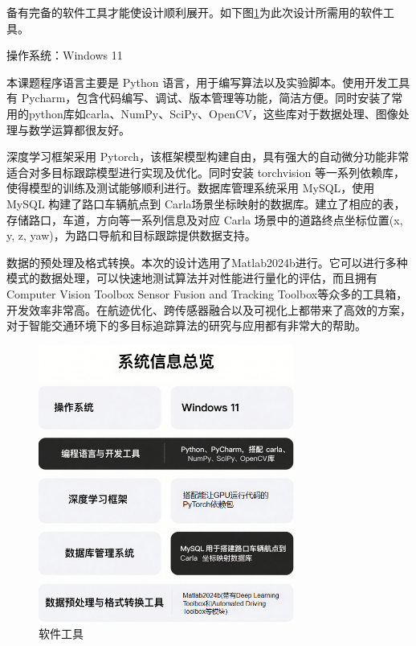 备有完备的软件工具才能使设计顺利展开。如下图\ref{fig:p31}为此次设计所需用的软件工具。

操作系统：Windows 11

本课题程序语言主要是 Python 语言，用于编写算法以及实验脚本。使用开发工具有 Pycharm，包含代码编写、调试、版本管理等功能，简洁方便。同时安装了常用的python库如carla、NumPy、SciPy、OpenCV，这些库对于数据处理、图像处理与数学运算都很友好。

深度学习框架采用 Pytorch，该框架模型构建自由，具有强大的自动微分功能非常适合对多目标跟踪模型进行实现及优化。同时安装 torchvision 等一系列依赖库，使得模型的训练及测试能够顺利进行。数据库管理系统采用 MySQL，使用 MySQL 构建了路口车辆航点到 Carla场景坐标映射的数据库。建立了相应的表，存储路口，车道，方向等一系列信息及对应 Carla 场景中的道路终点坐标位置(x, y, z, yaw)，为路口导航和目标跟踪提供数据支持。

数据的预处理及格式转换。本次的设计选用了Matlab2024b进行。它可以进行多种模式的数据处理，可以快速地测试算法并对性能进行量化的评估，而且拥有Computer Vision Toolbox Sensor Fusion and Tracking Toolbox等众多的工具箱，开发效率非常高。在航迹优化、跨传感器融合以及可视化上都带来了高效的方案，对于智能交通环境下的多目标追踪算法的研究与应用都有非常大的帮助。



\begin{figure}[htbp] %
	\centering
	\includegraphics[width=0.75\textwidth]{p31} %
	\caption{软件工具} %
	\label{fig:p31} %
\end{figure}










